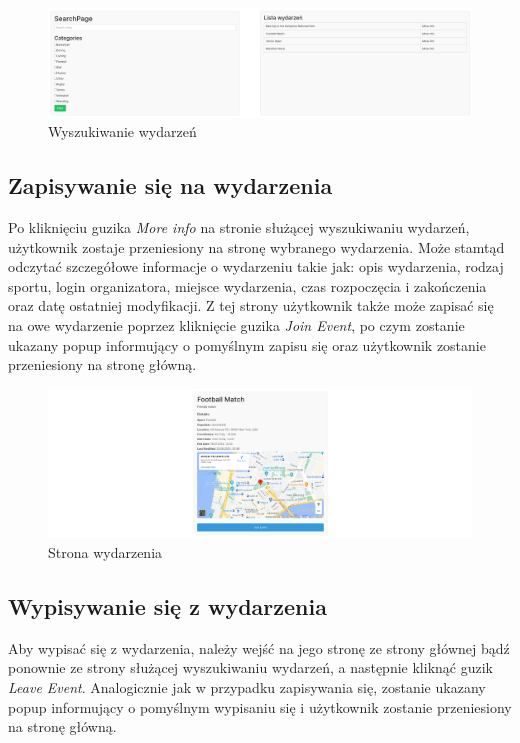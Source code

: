 \documentclass[11pt,a4paper]{article}
\begin{document}
\begin{figure} [H]
    \centering
    \includegraphics[width=1\linewidth]{pages/search_events.png}
    \caption{Wyszukiwanie wydarzeń}
\end{figure}

\subsection{Zapisywanie się na wydarzenia}

Po kliknięciu guzika \textit{More info} na stronie służącej wyszukiwaniu wydarzeń, użytkownik zostaje przeniesiony na stronę wybranego wydarzenia. Może stamtąd odczytać szczegółowe informacje o wydarzeniu takie jak: opis wydarzenia, rodzaj sportu, login organizatora, miejsce wydarzenia, czas rozpoczęcia i zakończenia oraz datę ostatniej modyfikacji. Z tej strony użytkownik także może zapisać się na owe wydarzenie poprzez kliknięcie guzika \textit{Join Event}, po czym zostanie ukazany popup informujący o pomyślnym zapisu się oraz użytkownik zostanie przeniesiony na stronę główną.

\begin{figure} [H]
    \centering
    \includegraphics[width=1\linewidth]{pages/event.png}
    \caption{Strona wydarzenia}
\end{figure}

\subsection{Wypisywanie się z wydarzenia}

Aby wypisać się z wydarzenia, należy wejść na jego stronę ze strony głównej bądź ponownie ze strony służącej wyszukiwaniu wydarzeń, a następnie kliknąć guzik \textit{Leave Event}. Analogicznie jak w przypadku zapisywania się, zostanie ukazany popup informujący o pomyślnym wypisaniu się i użytkownik zostanie przeniesiony na stronę główną.
\end{document}
